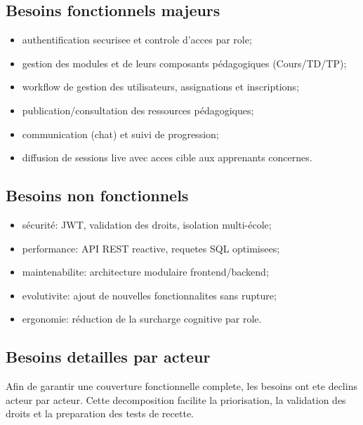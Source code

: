 \documentclass[12pt,a4paper,oneside]{report}
\begin{document}
\subsection{Besoins fonctionnels majeurs}

\begin{itemize}
  \item authentification securisee et controle d'acces par role;
  \item gestion des modules et de leurs composants pédagogiques (Cours/TD/TP);
  \item workflow de gestion des utilisateurs, assignations et inscriptions;
  \item publication/consultation des ressources pédagogiques;
  \item communication (chat) et suivi de progression;
  \item diffusion de sessions live avec acces cible aux apprenants concernes.
\end{itemize}

\subsection{Besoins non fonctionnels}

\begin{itemize}
  \item sécurité: JWT, validation des droits, isolation multi-école;
  \item performance: API REST reactive, requetes SQL optimisees;
  \item maintenabilite: architecture modulaire frontend/backend;
  \item evolutivite: ajout de nouvelles fonctionnalites sans rupture;
  \item ergonomie: réduction de la surcharge cognitive par role.
\end{itemize}

\subsection{Besoins detailles par acteur}

Afin de garantir une couverture fonctionnelle complete, les besoins ont ete declins acteur par acteur. Cette decomposition facilite la priorisation, la validation des droits et la preparation des tests de recette.
\end{document}
